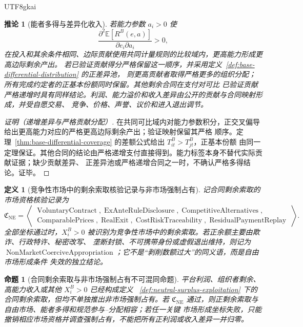 \documentclass[12pt,a4paper,openany]{report}
\newtheorem{definition}{定义}[chapter]
\newtheorem{proposition}{命题}[chapter]
\newtheorem{corollary}{推论}[chapter]
\newcommand{\EE}{\mathbb E}
\begin{document}
\begin{CJK*}{UTF8}{gkai}
\begin{corollary}[能者多得与差异化收入]
\label{cor:ability-differential-residual}
若能力参数 \(a_i>0\) 使
\[
  \frac{\partial^2\EE[R^B(e,a)]}{\partial e_i\partial a_i}>0,
\]
在投入和其余条件相同、边际贡献使用共同计量规则的比较域内，更高能力形成更高边际剩余产出。
若已验证贡献得分严格保留这一顺序，并采用定义~\ref{def:base-differential-distribution} 的正差异池，
则更高贡献者取得严格更多的组织分配；所有完成约定者的正基本份额同时保留。其他剩余合同在支付对可比
已验证贡献严格递增时具有同样结论。利润、能力溢价和收入差异由公开的贡献与合同映射形成，并受自愿交易、
竞争、价格、声誉、议价和进入退出调节。
\end{corollary}

\begin{proof}[证明（递增差异与严格贡献分配）]
在共同可比域内对能力参数积分，正交叉偏导给出更高能力对应的严格更高边际剩余产出；验证映射保留其严格
顺序。定理~\ref{thm:base-differential-coverage} 的差额公式给出 \(T_{it}^B>T_{jt}^B\)，正基本份额
由同一定理保证。其他合同的结论由严格递增支付直接得到。能力标签本身不替代实际贡献证据；缺少贡献差异、
正差异池或严格递增合同之一时，不确认严格多得结论。证毕。
\end{proof}

\begin{definition}[竞争性市场中的剩余索取核验记录与非市场强制占有]
记合同剩余索取的市场资格核验记录为
\[
  \mathfrak C_{\mathrm{NE}}
  =
  \left\langle
  \begin{gathered}
  \operatorname{VoluntaryContract},
  \operatorname{ExAnteRuleDisclosure},
  \operatorname{CompetitiveAlternatives},\\
  \operatorname{ComparablePrices},
  \operatorname{RealExit},
  \operatorname{CostRiskTraceability},
  \operatorname{ResidualPaymentReplay}
  \end{gathered}
  \right\rangle.
\]
全部坐标通过时，\(X_i^B>0\) 被识别为竞争性市场中的剩余索取。若正余额主要由欺诈、行政特许、秘密改写、
垄断封锁、不可携带身份或虚假退出维持，则记为
\(\operatorname{NonMarketCoerciveAppropriation}\)；它不是“剥削数额过大”的同义语，而是自由市场形成条件
失效的独立结论。
\end{definition}

\begin{proposition}[合同剩余索取与非市场强制占有不可混同命题]
\label{prop:appropriation-exploitation-separation}
平台利润、组织者剩余、高能力收入或其他 \(X_i^B>0\) 已经构成定义
~\ref{def:neutral-surplus-exploitation} 下的合同剩余索取，但均不单独推出非市场强制占有。若
\(\mathfrak C_{\mathrm{NE}}\) 通过，则正剩余索取与自由市场、能者多得和规范参与--分配相容；若任一关键
市场形成坐标失败，只能撤销相应市场资格并调查强制占有，不能把所有正利润或收入差异一并归零。
\end{proposition}


\end{CJK*}
\end{document}
